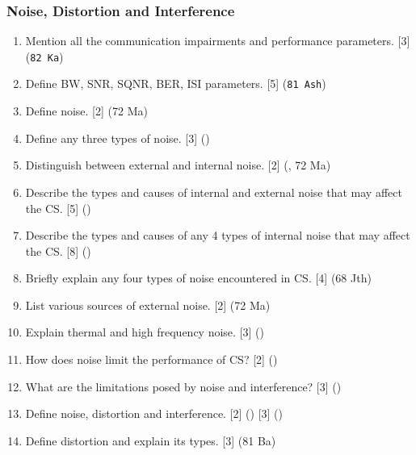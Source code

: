\documentclass[12pt]{article}
\begin{document}
    \subsubsection{Noise, Distortion and Interference}
      \begin{enumerate}[topsep=0pt, noitemsep]
        \item Mention all the communication impairments and performance parameters. \hfill [3] (\texttt{82 Ka})

        \item Define BW, SNR, SQNR, BER, ISI parameters. \hfill [5] (\texttt{81 Ash})
      
       \item Define noise. \hfill [2] (72 Ma)
       
       \item Define any three types of noise. \hfill [3] ()

        \item Distinguish between external and internal noise. \hfill [2] (, 72 Ma)

        \item Describe the types and causes of internal and external noise that may affect the CS. \hfill [5] ()

        \item Describe the types and causes of any 4 types of internal noise that may affect the CS. \hfill [8] ()

        \item Briefly explain any four types of noise encountered in CS. \hfill [4] (68 Jth)

        \item List various sources of external noise. \hfill [2] (72 Ma)

        \item Explain thermal and high frequency noise. \hfill [3] ()

        \item How does noise limit the performance of CS? \hfill [2] ()

        \item What are the limitations posed by noise and interference? \hfill [3] ()

        \item Define noise, distortion and interference. \hfill [2] () [3] ()
        
        \item Define distortion and explain its types. \hfill [3] (81 Ba)
        

\end{enumerate}
\end{document}
